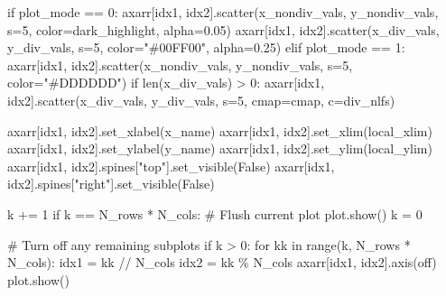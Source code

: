 \documentclass[
  letterpaper,
  DIV=11,
  numbers=noendperiod]{scrartcl}
\newenvironment{Shaded}{\begin{snugshade}}{\end{snugshade}}
\newcommand{\BuiltInTok}[1]{\textcolor[rgb]{0.00,0.23,0.31}{#1}}
\newcommand{\CommentTok}[1]{\textcolor[rgb]{0.37,0.37,0.37}{#1}}
\newcommand{\ControlFlowTok}[1]{\textcolor[rgb]{0.00,0.23,0.31}{#1}}
\newcommand{\DecValTok}[1]{\textcolor[rgb]{0.68,0.00,0.00}{#1}}
\newcommand{\FloatTok}[1]{\textcolor[rgb]{0.68,0.00,0.00}{#1}}
\newcommand{\KeywordTok}[1]{\textcolor[rgb]{0.00,0.23,0.31}{#1}}
\newcommand{\NormalTok}[1]{\textcolor[rgb]{0.00,0.23,0.31}{#1}}
\newcommand{\OperatorTok}[1]{\textcolor[rgb]{0.37,0.37,0.37}{#1}}
\newcommand{\StringTok}[1]{\textcolor[rgb]{0.13,0.47,0.30}{#1}}
\newcommand{\VariableTok}[1]{\textcolor[rgb]{0.07,0.07,0.07}{#1}}
\begin{document}
\begin{Shaded}
\begin{Highlighting}[]
    \ControlFlowTok{if}\NormalTok{ plot\_mode }\OperatorTok{==} \DecValTok{0}\NormalTok{:}
\NormalTok{      axarr[idx1, idx2].scatter(x\_nondiv\_vals, y\_nondiv\_vals, s}\OperatorTok{=}\DecValTok{5}\NormalTok{,}
\NormalTok{                                color}\OperatorTok{=}\NormalTok{dark\_highlight, alpha}\OperatorTok{=}\FloatTok{0.05}\NormalTok{)}
\NormalTok{      axarr[idx1, idx2].scatter(x\_div\_vals, y\_div\_vals, s}\OperatorTok{=}\DecValTok{5}\NormalTok{,}
\NormalTok{                                color}\OperatorTok{=}\StringTok{"\#00FF00"}\NormalTok{, alpha}\OperatorTok{=}\FloatTok{0.25}\NormalTok{)}
    \ControlFlowTok{elif}\NormalTok{ plot\_mode }\OperatorTok{==} \DecValTok{1}\NormalTok{:}
\NormalTok{      axarr[idx1, idx2].scatter(x\_nondiv\_vals, y\_nondiv\_vals,}
\NormalTok{                                s}\OperatorTok{=}\DecValTok{5}\NormalTok{, color}\OperatorTok{=}\StringTok{"\#DDDDDD"}\NormalTok{)}
      \ControlFlowTok{if} \BuiltInTok{len}\NormalTok{(x\_div\_vals) }\OperatorTok{\textgreater{}} \DecValTok{0}\NormalTok{:}
\NormalTok{        axarr[idx1, idx2].scatter(x\_div\_vals, y\_div\_vals, s}\OperatorTok{=}\DecValTok{5}\NormalTok{,}
\NormalTok{                                  cmap}\OperatorTok{=}\NormalTok{cmap, c}\OperatorTok{=}\NormalTok{div\_nlfs)}

\NormalTok{    axarr[idx1, idx2].set\_xlabel(x\_name)}
\NormalTok{    axarr[idx1, idx2].set\_xlim(local\_xlim)}
\NormalTok{    axarr[idx1, idx2].set\_ylabel(y\_name)}
\NormalTok{    axarr[idx1, idx2].set\_ylim(local\_ylim)}
\NormalTok{    axarr[idx1, idx2].spines[}\StringTok{"top"}\NormalTok{].set\_visible(}\VariableTok{False}\NormalTok{)}
\NormalTok{    axarr[idx1, idx2].spines[}\StringTok{"right"}\NormalTok{].set\_visible(}\VariableTok{False}\NormalTok{)}

\NormalTok{    k }\OperatorTok{+=} \DecValTok{1}
    \ControlFlowTok{if}\NormalTok{ k }\OperatorTok{==}\NormalTok{ N\_rows }\OperatorTok{*}\NormalTok{ N\_cols:}
      \CommentTok{\# Flush current plot}
\NormalTok{      plot.show()}
\NormalTok{      k }\OperatorTok{=} \DecValTok{0}

  \CommentTok{\# Turn off any remaining subplots}
  \ControlFlowTok{if}\NormalTok{ k }\OperatorTok{\textgreater{}} \DecValTok{0}\NormalTok{:}
    \ControlFlowTok{for}\NormalTok{ kk }\KeywordTok{in} \BuiltInTok{range}\NormalTok{(k, N\_rows }\OperatorTok{*}\NormalTok{ N\_cols):}
\NormalTok{      idx1 }\OperatorTok{=}\NormalTok{ kk }\OperatorTok{//}\NormalTok{ N\_cols}
\NormalTok{      idx2 }\OperatorTok{=}\NormalTok{ kk }\OperatorTok{\%}\NormalTok{ N\_cols}
\NormalTok{      axarr[idx1, idx2].axis(}\StringTok{\textquotesingle{}off\textquotesingle{}}\NormalTok{)}
\NormalTok{    plot.show()}
\end{Highlighting}
\end{Shaded}
\end{document}
